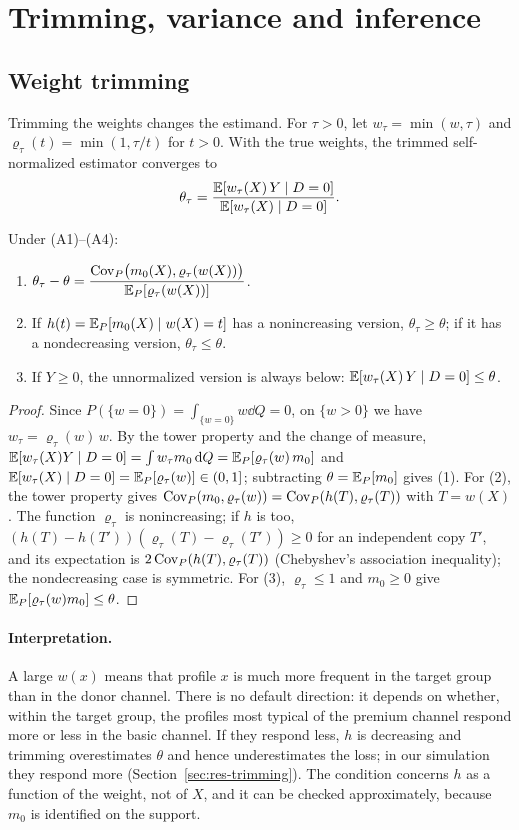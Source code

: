\section{Trimming, variance and inference}\label{sec:inference}

\subsection{Weight trimming}\label{sec:trimming}

Trimming the weights changes the estimand. For $\tau>0$, let $w_\tau=\min(w,\tau)$ and $\varrho_\tau(t)=\min(1,\tau/t)$ for $t>0$. With the true weights, the trimmed self-normalized estimator converges to
\[
\theta_\tau=\frac{\mathbb{E}[w_\tau(X)\,Y\mid D=0]}{\mathbb{E}[w_\tau(X)\mid D=0]}.
\]

\begin{proposition}\label{prop:trimming}
Under (A1)--(A4):
\begin{enumerate}
  \item $\displaystyle\theta_\tau-\theta=\frac{\operatorname{Cov}_P\bigl(m_0(X),\varrho_\tau(w(X))\bigr)}{\mathbb{E}_P[\varrho_\tau(w(X))]}$.
  \item If $h(t)=\mathbb{E}_P[m_0(X)\mid w(X)=t]$ has a nonincreasing version, $\theta_\tau\ge\theta$; if it has a nondecreasing version, $\theta_\tau\le\theta$.
  \item If $Y\ge0$, the unnormalized version is always below: $\mathbb{E}[w_\tau(X)\,Y\mid D=0]\le\theta$.
\end{enumerate}
\end{proposition}
\begin{proof}
Since $P(\{w=0\})=\int_{\{w=0\}}w\dd Q=0$, on $\{w>0\}$ we have $w_\tau=\varrho_\tau(w)\,w$. By the tower property and the change of measure, $\mathbb{E}[w_\tau(X)Y\mid D=0]=\int w_\tau m_0\,\mathrm{d} Q=\mathbb{E}_P[\varrho_\tau(w)\,m_0]$ and $\mathbb{E}[w_\tau(X)\mid D=0]=\mathbb{E}_P[\varrho_\tau(w)]\in(0,1]$; subtracting $\theta=\mathbb{E}_P[m_0]$ gives (1). For (2), the tower property gives $\operatorname{Cov}_P(m_0,\varrho_\tau(w))=\operatorname{Cov}_P(h(T),\varrho_\tau(T))$ with $T=w(X)$. The function $\varrho_\tau$ is nonincreasing; if $h$ is too, $(h(T)-h(T'))(\varrho_\tau(T)-\varrho_\tau(T'))\ge0$ for an independent copy $T'$, and its expectation is $2\operatorname{Cov}_P(h(T),\varrho_\tau(T))$ (Chebyshev's association inequality); the nondecreasing case is symmetric. For (3), $\varrho_\tau\le1$ and $m_0\ge0$ give $\mathbb{E}_P[\varrho_\tau(w)m_0]\le\theta$.
\end{proof}

\paragraph{Interpretation.} A large $w(x)$ means that profile $x$ is much more frequent in the target group than in the donor channel. There is no default direction: it depends on whether, within the target group, the profiles most typical of the premium channel respond more or less in the basic channel. If they respond less, $h$ is decreasing and trimming overestimates $\theta$ and hence underestimates the loss; in our simulation they respond more (Section~\ref{sec:res-trimming}). The condition concerns $h$ as a function of the weight, not of $X$, and it can be checked approximately, because $m_0$ is identified on the support.

